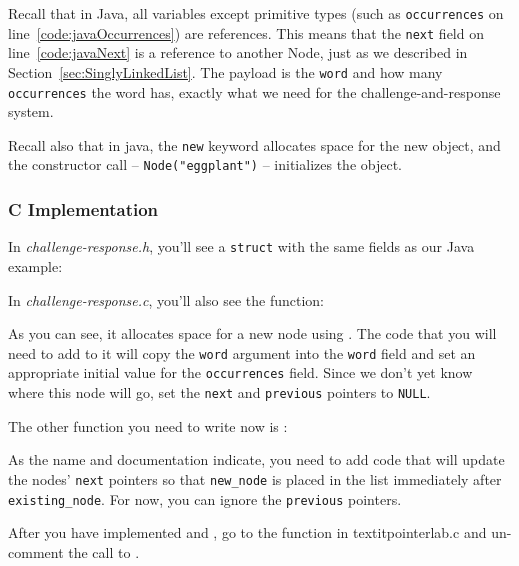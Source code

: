 Recall that in Java, all variables except primitive types (such as
\lstinline{occurrences} on line~\ref{code:javaOccurrences}) are references. This
means that the \lstinline{next} field on line~\ref{code:javaNext} is a reference
to another Node, just as we described in Section~\ref{sec:SinglyLinkedList}.
The payload is the \lstinline{word} and how many \lstinline{occurrences} the
word has, exactly what we need for the challenge-and-response system.

Recall also that in java, the \lstinline{new} keyword allocates space for the
new object, and the constructor call -- \lstinline{Node("eggplant")} --
initializes the object.

\subsubsection{C Implementation}

In \textit{challenge-response.h}, you'll see a \lstinline{struct} with the same
fields as our Java example:



In \textit{challenge-response.c}, you'll also see the 
function:



As you can see, it allocates space for a new node using .
The code that you will need to add to it will copy the \lstinline{word}
argument into the \lstinline{word} field and set an appropriate initial value
for the \lstinline{occurrences} field. Since we don't yet know where this node
will go, set the \lstinline{next} and \lstinline{previous} pointers to
\lstinline{NULL}.

The other function you need to write now is :



As the name and documentation indicate, you need to add code that will update
the nodes' \lstinline{next} pointers so that \lstinline{new_node} is placed in
the list immediately after \lstinline{existing_node}. For now, you can ignore
the \lstinline{previous} pointers.

After you have implemented  and
, go to the  function in
textit{pointerlab.c} and un-comment the call to
.

